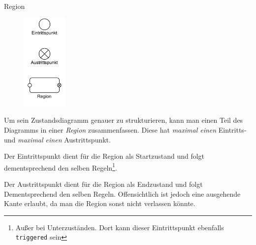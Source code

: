 \begin{diag}{Region}
    \begin{figure}
        \centering
        \includegraphics[width=0.2\textwidth]{includes/figures/defi_diagrams_state_region.pdf}
    \end{figure}
    Um sein Zustandsdiagramm genauer zu strukturieren, kann man einen Teil des Diagramms in einer \emph{Region} zusammenfassen.
    Diese hat \emph{maximal einen} Eintritts- und \emph{maximal einen} Austrittspunkt.

    Der Eintrittspunkt dient für die Region als Startzustand und folgt dementsprechend den selben Regeln\footnote{
        Außer bei Unterzuständen.
        Dort kann dieser Eintrittspunkt ebenfalls \texttt{triggered} sein
    }.

    Der Austrittspunkt dient für die Region als Endzustand und folgt Dementsprechend den selben Regeln.
    Offensichtlich ist jedoch eine ausgehende Kante erlaubt, da man die Region sonst nicht verlassen könnte.

    \vspace{1.5cm}
\end{diag}

